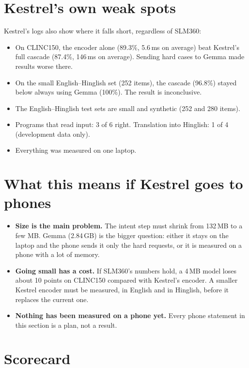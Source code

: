 \documentclass[11pt,a4paper]{article}
\begin{document}
\section{Kestrel's own weak spots}

Kestrel's logs also show where it falls short, regardless of SLM360:

\begin{itemize}
  \item On CLINC150, the encoder alone (89.3\%, 5.6\,ms on average) beat Kestrel's full cascade (87.4\%, 146\,ms on
  average). Sending hard cases to Gemma made results worse there.
  \item On the small English--Hinglish set (252 items), the cascade (96.8\%) stayed below always using Gemma (100\%).
  The result is inconclusive.
  \item The English--Hinglish test sets are small and synthetic (252 and 280 items).
  \item Programs that read input: 3 of 6 right. Translation into Hinglish: 1 of 4 (development data only).
  \item Everything was measured on one laptop.
\end{itemize}

\section{What this means if Kestrel goes to phones}

\begin{itemize}
  \item \textbf{Size is the main problem.} The intent step must shrink from 132\,MB to a few MB. Gemma (2.84\,GB) is
  the bigger question: either it stays on the laptop and the phone sends it only the hard requests, or it is measured on
  a phone with a lot of memory.
  \item \textbf{Going small has a cost.} If SLM360's numbers hold, a 4\,MB model loses about 10 points on CLINC150
  compared with Kestrel's encoder. A smaller Kestrel encoder must be measured, in English and in Hinglish, before it
  replaces the current one.
  \item \textbf{Nothing has been measured on a phone yet.} Every phone statement in this section is a plan, not a
  result.
\end{itemize}

\section{Scorecard}
\end{document}
